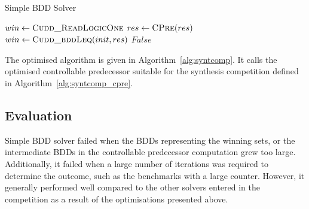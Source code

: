 \begin{algorithm}
\caption{Simple BDD Solver}
\label{alg:syntcomp}

\begin{algorithmic}


    \State $win \gets \Call{Cudd\_ReadLogicOne}{}$
    \Loop
        \State $res \gets \Call{CPre}{res}$
        \State $win \gets \Call{Cudd\_bddLeq}{init, res}$
            \State \Return $False$
        \EndIf
    \EndLoop

\EndFunction

\end{algorithmic}
\end{algorithm}

The optimised algorithm is given in Algorithm~\ref{alg:syntcomp}. It calls the optimised controllable predecessor suitable for the synthesis competition defined in Algorithm~\ref{alg:syntcomp_cpre}.

\subsection{Evaluation}
Simple BDD solver failed when the BDDs representing the winning sets, or the intermediate BDDs in the controllable predecessor computation grew too large. Additionally, it failed when a large number of iterations was required to determine the outcome, such as the benchmarks with a large counter. However, it generally performed well compared to the other solvers entered in the competition as a result of the optimisations presented above.


